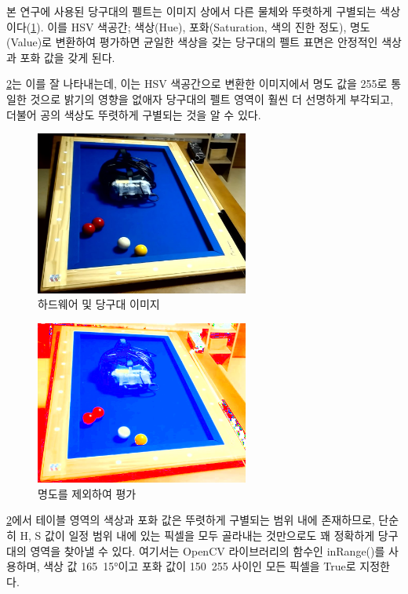 \documentclass[10pt]{oblivoir}
\begin{document}
본 연구에 사용된 당구대의 펠트는 이미지 상에서 다른 물체와 뚜렷하게 구별되는 색상이다(\cref{fig;table}). 이를 HSV 색공간; 색상(Hue), 포화(Saturation, 색의 진한 정도), 명도(Value)로 변환하여 평가하면 균일한 색상을 갖는 당구대의 펠트 표면은 안정적인 색상과 포화 값을 갖게 된다.

\cref{fig;table-hsv-coloronly}는 이를 잘 나타내는데, 이는 HSV 색공간으로 변환한 이미지에서 명도 값을 255로 통일한 것으로 밝기의 영향을 없애자 당구대의 펠트 영역이 훨씬 더 선명하게 부각되고, 더불어 공의 색상도 뚜렷하게 구별되는 것을 알 수 있다.

\begin{figure}[ht]
    \centering
    \includegraphics[width=7cm]{img/billiards-table.png}
    \caption{하드웨어 및 당구대 이미지}
    \label{fig;table}
\end{figure}

\begin{figure}[ht]
    \centering
    \includegraphics[width=7cm]{img/table-coloronly.png}
    \caption{명도를 제외하여 평가}
    \label{fig;table-hsv-coloronly}
\end{figure}

\cref{fig;table-hsv-coloronly}에서 테이블 영역의 색상과 포화 값은 뚜렷하게 구별되는 범위 내에 존재하므로, 단순히 H, S 값이 일정 범위 내에 있는 픽셀을 모두 골라내는 것만으로도 꽤 정확하게 당구대의 영역을 찾아낼 수 있다. 여기서는 OpenCV 라이브러리의 함수인 inRange()를 사용하며, 색상 값 165~15\si{\degree}이고 포화 값이 150~255 사이인 모든 픽셀을 True로 지정한다.
\end{document}
